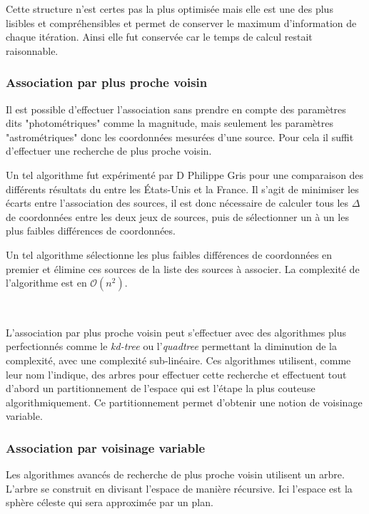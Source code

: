 Cette structure n'est certes pas la plus optimisée mais elle est une des plus lisibles et compréhensibles et permet de conserver le maximum d'information de chaque itération. Ainsi elle fut conservée car le temps de calcul restait raisonnable.

		\subsubsection{Association par plus proche voisin}

Il est possible d'effectuer l'association sans prendre en compte des paramètres dits "photométriques" comme la magnitude, mais seulement les paramètres "astrométriques" donc les coordonnées mesurées d'une source. Pour cela il suffit d'effectuer une recherche de plus proche voisin.

Un tel algorithme fut expérimenté par D Philippe Gris pour une comparaison des différents résultats du \stack{} entre les États-Unis et la France. Il s'agit de minimiser les écarts entre l'association des sources, il est donc nécessaire de calculer tous les $\Delta$ de coordonnées entre les deux jeux de sources, puis de sélectionner un à un les plus faibles différences de coordonnées.

Un tel algorithme sélectionne les plus faibles différences de coordonnées en premier et élimine ces sources de la liste des sources à associer. La complexité de l'algorithme est en $\mathcal{O}(n^2)$.

\

L'association par plus proche voisin peut s'effectuer avec des algorithmes plus perfectionnés comme le \emph{kd-tree} ou l'\emph{quadtree} permettant la diminution de la complexité, avec une complexité sub-linéaire. Ces algorithmes utilisent, comme leur nom l'indique, des arbres pour effectuer cette recherche et effectuent tout d'abord un partitionnement de l'espace qui est l'étape la plus couteuse algorithmiquement. Ce partitionnement permet d'obtenir une notion de voisinage variable.

		\subsubsection{Association par voisinage variable}

Les algorithmes avancés de recherche de plus proche voisin utilisent un arbre. L'arbre se construit en divisant l'espace de manière récursive. Ici l'espace est la sphère céleste qui sera approximée par un plan.


